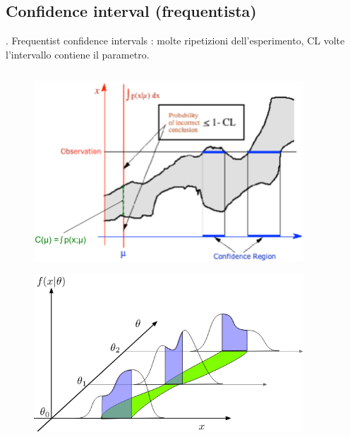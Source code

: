 \documentclass[asd-beamer.tex]{subfiles}%
\begin{document}
\subsection{Confidence interval (frequentista)}

\begin{frame}{. Frequentist confidence intervals}
: molte ripetizioni dell'esperimento, CL volte l'intervallo contiene il parametro.
\begin{columns}[T]
\begin{column}{0.4\textwidth}
	\begin{figure}
		\centering
		\includegraphics[width=0.9\textwidth,keepaspectratio]{figures/interval/clband}
		\label{fig:clband}
	\end{figure}
	\begin{figure}
		\centering
		\includegraphics[width=0.9\textwidth,keepaspectratio]{figures/interval/neyman}
		\label{fig:neyman}
	\end{figure}
\end{column}

\end{columns}
\end{frame}
\end{document}
